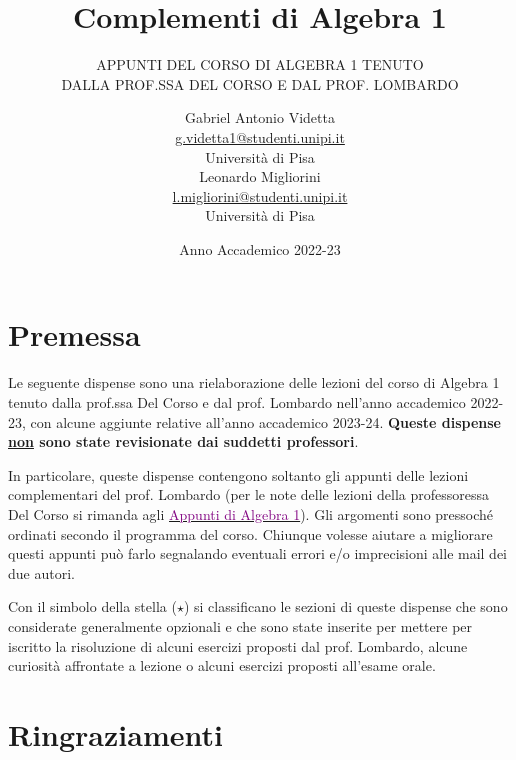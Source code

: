 \documentclass[11pt]{scrartcl}
\begin{document}
	\title{Complementi di Algebra 1}
	\subtitle{\large\normalfont\rmfamily\scshape APPUNTI DEL CORSO DI ALGEBRA 1 TENUTO\\ DALLA PROF.SSA DEL CORSO E DAL PROF. LOMBARDO}
	\author{Gabriel Antonio Videtta \\ \textnormal{\href{g.videtta1@studenti.unipi.it}{g.videtta1@studenti.unipi.it}} \\ Università di Pisa \\[0.3in] Leonardo Migliorini \\ \textnormal{\href{l.migliorini@studenti.unipi.it}{l.migliorini@studenti.unipi.it}} \\ Università di Pisa}
	\date{Anno Accademico 2022-23}
	\maketitle
	\newpage
	
	\tableofcontents
	
	\newpage
	
	\section*{Premessa}
	Le seguente dispense sono una rielaborazione delle lezioni del corso di Algebra 1 tenuto dalla prof.ssa Del Corso e dal prof. Lombardo nell'anno accademico 
	2022-23, con alcune aggiunte relative all'anno accademico 2023-24. \textbf{Queste dispense \underline{non} sono state revisionate dai suddetti professori}. \medskip
	
	In particolare, queste dispense contengono soltanto gli appunti delle lezioni complementari del prof. Lombardo (per
	le note delle lezioni della professoressa Del Corso si rimanda agli \href{https://github.com/diego-unipi/Algebra-1}{\textcolor{purple}{Appunti di Algebra 1}}). Gli argomenti sono pressoché ordinati secondo il programma del corso.
	Chiunque volesse aiutare a migliorare questi appunti può farlo segnalando eventuali errori e/o imprecisioni alle mail dei due autori. \medskip
	
	Con il simbolo della stella ($\star$) si classificano le sezioni di queste dispense che
	sono considerate generalmente opzionali e che sono state inserite per mettere per iscritto la
	risoluzione di alcuni esercizi proposti dal prof. Lombardo, alcune curiosità
	affrontate a lezione o alcuni esercizi proposti all'esame orale.
	
	\section*{Ringraziamenti}
	
\end{document}

